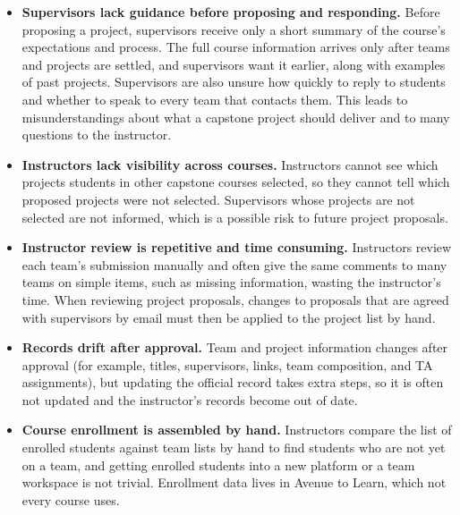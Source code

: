\documentclass[12pt]{article}
\newcounter{tin}
\begin{document}
\begin{itemize}
    is not shared with other teams applying for the same project. Nobody can see which teams are in contact with
    which supervisors. There is also no record that a team and a supervisor agreed to work together.
    Students sometimes report that a supervisor agreed when the supervisor has no record of the team, so
    the instructor must confirm agreements separately.
    \item \textbf{Supervisors lack guidance before proposing and responding.} Before proposing a project,
    supervisors receive only a short summary of the course's expectations and process. The full course
    information arrives only after teams and projects are settled, and supervisors want it earlier, along
    with examples of past projects. Supervisors are also unsure how quickly to reply to students and
    whether to speak to every team that contacts them. This leads to misunderstandings about what a
    capstone project should deliver and to many questions to the instructor.
    \item \textbf{Instructors lack visibility across courses.} Instructors cannot see which projects
    students in other capstone courses selected, so they cannot tell which proposed projects were not
    selected. Supervisors whose projects are not selected are not informed, which is a possible
    risk to future project proposals.
    \item \textbf{Instructor review is repetitive and time consuming.} Instructors review each team's submission manually and often
    give the same comments to many teams on simple items, such as missing information, wasting the instructor's time.
    When reviewing project proposals, changes to proposals that are agreed with supervisors by email must then be
    applied to the project list by hand.
    \item \textbf{Records drift after approval.} Team and project information changes after approval (for
    example, titles, supervisors, links, team composition, and TA assignments), but updating the official
    record takes extra steps, so it is often not updated and the instructor's records become out of date.
    \item \textbf{Course enrollment is assembled by hand.} Instructors compare the list of enrolled students against
    team lists by hand to find students who are not yet on a team, and getting enrolled students into a new platform or a
    team workspace is not trivial. Enrollment data lives in Avenue to Learn, which not every course uses.
  \end{itemize}
\end{document}
